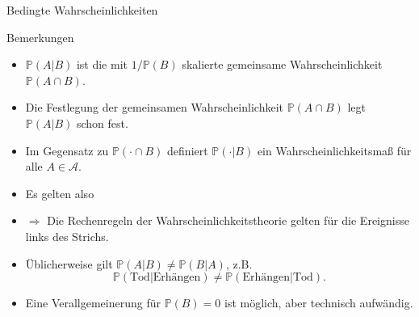 \documentclass[
  8pt,
  ignorenonframetext,
]{beamer}
\begin{document}
\begin{frame}{Bedingte Wahrscheinlichkeiten}
\protect\hypertarget{bedingte-wahrscheinlichkeiten-1}{}
\small
{}

Bemerkungen

\begin{itemize}
\itemsep1mm
\item $\mathbb{P}(A|B)$ ist die mit $1/\mathbb{P}(B)$ skalierte gemeinsame Wahrscheinlichkeit $\mathbb{P}(A \cap B)$.
\item Die Festlegung der gemeinsamen Wahrscheinlichkeit $\mathbb{P}(A \cap B)$ legt $\mathbb{P}(A|B)$ schon fest.
\item Im Gegensatz zu $\mathbb{P}(\cdot \cap B)$ definiert $\mathbb{P}(\cdot \vert B)$ ein Wahrscheinlichkeitsmaß für alle $A \in \mathcal{A}$.
\item Es gelten also 
\begin{itemize}
\end{itemize}
\item $\Rightarrow$ Die Rechenregeln der Wahrscheinlichkeitstheorie gelten für die Ereignisse links des Strichs. 
\item Üblicherweise gilt $\mathbb{P}(A|B) \neq \mathbb{P}(B|A)$, z.B. 
\begin{equation*}
\mathbb{P}(\mbox{Tod}|\mbox{Erhängen}) \neq  \mathbb{P}(\mbox{Erhängen}|\mbox{Tod}).
\end{equation*}
\item Eine Verallgemeinerung für $\mathbb{P}(B) = 0$ ist möglich, aber technisch aufwändig.
\end{itemize}
\end{frame}
\end{document}
